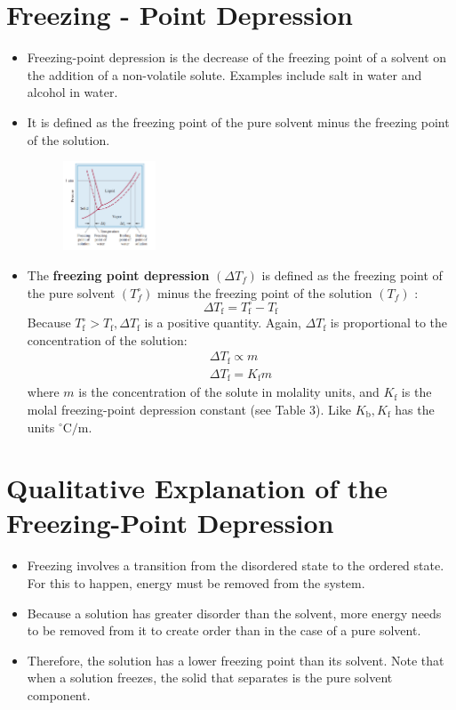 \documentclass[a4paper,12pt,twocolumn]{article}
\begin{document}
\section{Freezing - Point Depression}
\begin{itemize}
\item Freezing-point depression is the decrease of the freezing point of a solvent on the addition of a non-volatile solute. Examples include salt in water and alcohol in water.
\item It is defined as the freezing point of the pure solvent minus the freezing point of the solution.


\begin{figure}[h]
\begin{center}
\includegraphics[width=0.26\textwidth, keepaspectratio]{Screenshot 2023-03-23 161120.png}
\end{center}
\end{figure}

\item The \textbf{freezing point depression} $\left(\Delta T_f\right)$ is defined as the freezing point of the pure solvent $\left(T_f^{\circ}\right)$ minus the freezing point of the solution $\left(T_f\right)$ :
$$
\Delta T_{\mathrm{f}}=T_{\mathrm{f}}^{\circ}-T_{\mathrm{f}}
$$
Because $T_{\mathrm{f}}^{\circ}>T_{\mathrm{f}}, \Delta T_{\mathrm{f}}$ is a positive quantity. Again, $\Delta T_{\mathrm{f}}$ is proportional to the concentration of the solution:
$$
\begin{gathered}
\Delta T_{\mathrm{f}} \propto m \\
\Delta T_{\mathrm{f}}=K_{\mathrm{f}} m
\end{gathered}
$$
where $m$ is the concentration of the solute in molality units, and $K_{\mathrm{f}}$ is the molal freezing-point depression constant (see Table 3). Like $K_{\mathrm{b}}, K_{\mathrm{f}}$ has the units ${ }^{\circ} \mathrm{C} / \mathrm{m}$.
\end{itemize}
\section{Qualitative Explanation of the Freezing-Point Depression}
\begin{itemize}
\item Freezing involves a transition from the disordered state to the ordered state. For this to happen, energy must be removed from the system. 
\item Because a solution has greater disorder than the solvent, more energy needs to be removed from it to create order than in the case of a pure solvent. 
\item Therefore, the solution has a lower freezing point than its solvent. Note that when a solution freezes, the solid that separates is the pure solvent component.
\end{itemize}
\end{document}
